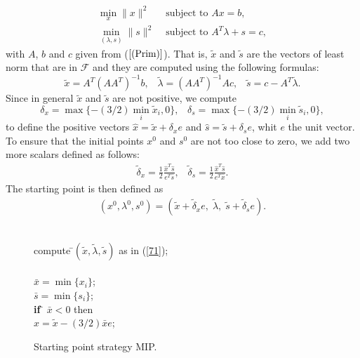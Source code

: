 \documentclass[a4paper,10 pt,titlepage,twoside]{book}
\theoremstyle{plain}
\theoremstyle{definition}
\theoremstyle{remark}
\begin{document}
{{\begin{align*}
\min\limits_{x} \lVert x \rVert ^{2} &\text{ subject to }Ax = b,\\
\min\limits_{(\lambda,s)} \lVert s \rVert ^{2} &\text{ subject to } A^{T}\lambda +s = c,
\end{align*}
with $A$, $b$ and $c$ given from ($\ref{(Prim)}$). That is, $\tilde{x}$ and $\tilde{s}$ are the vectors of least norm that are in $\mathcal{F}$ and they are computed using the following formulas:
\begin{equation}\label{71}
\tilde{x} = A^{T}(AA^{T})^{-1}b,\;\;\;\tilde{\lambda}=(AA^{T})^{-1}Ac,\;\;\; \tilde{s} = c- A^{T}\tilde{\lambda}.
\end{equation}
Since in general $\tilde{x}$ and $\tilde{s}$ are not positive, we compute
\begin{equation*}
\delta_{x} = \max\{-(3/2)\min\limits_{i}\tilde{x}_{i},0\},\;\;\; \delta_{s} = \max\{-(3/2)\min\limits_{i}\tilde{s}_{i},0\},
\end{equation*}
to define the positive vectors $\hat{x}= \tilde{x}+\delta_{x}e$ and $\hat{s}= \tilde{s}+\delta_{s}e$, whit $e$ the unit vector. To ensure that the initial points $x^{0}$ and $s^{0}$ are not too close to zero, we add two more scalars defined as follows:
\begin{align}\label{72}
\tilde{\delta}_{x}= \frac{1}{2}\frac{\hat{x}^{T}\hat{s}}{e^{T}\hat{s}},\;\;\;\tilde{\delta}_{s} =\frac{1}{2}\frac{\hat{x}^{T}\hat{s}}{e^{T}\hat{x}}.
\end{align}
The starting point is then defined as 
\begin{align*}
(x^{0}, \lambda^{0}, s^{0}) = (\tilde{x}+\tilde{\delta}_{x} e,\;\tilde{\lambda},\;\tilde{s}+\tilde{\delta}_{s} e).
\end{align*}
\\
\begin{figure}\caption{\label{fig:MIP}Starting point strategy MIP.}
	\centering
	{\noindent\begin{boxedminipage}{1\linewidth}
			\begin{tabbing}
			compute \=$(\tilde{x},\tilde{\lambda},\tilde{s})$ as in (\ref{71});\\				
			\=\\
				\>$\bar{x} = \min\{x_{i}\}$;\\
				\>$\bar{s} = \min\{s_{i}\}$;\\
				\textbf{if} \= $\bar{x}<0$ then\\
				\> $\hat{x}= \tilde{x} -(3/2)\bar{x}e$;\\

\end{tabbing}
\end{boxedminipage}}
\end{figure}}}
\end{document}
